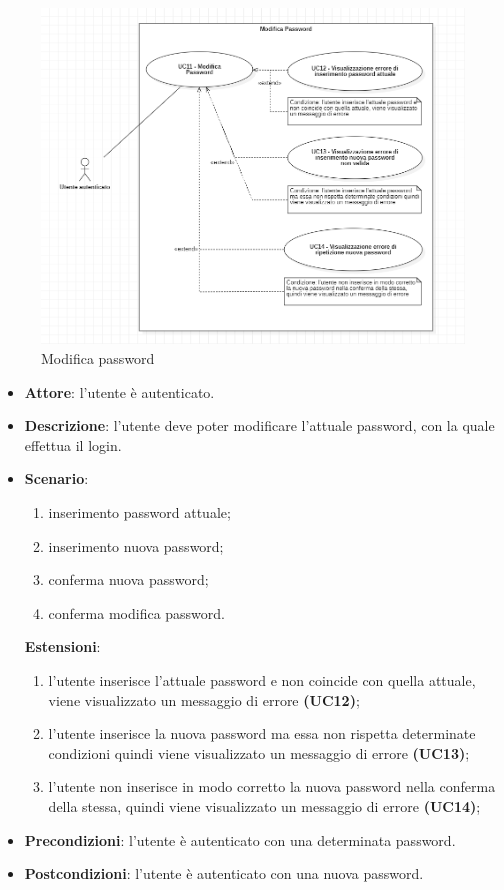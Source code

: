 \begin{figure}[H]
    \includegraphics[width=15cm]{sezioni/Images/UC11.png}
    \centering
    \caption{Modifica password}
\end{figure}

\begin{itemize}
    \item \textbf{Attore}: l'utente è autenticato.
    \item \textbf{Descrizione}: l'utente deve poter modificare l'attuale password, con la quale effettua il login.
    \item \textbf{Scenario}:
    \begin{enumerate}
        \item inserimento password attuale;
        \item inserimento nuova password;
        \item conferma nuova password;
        \item conferma modifica password.
    \end{enumerate}
    \textbf{Estensioni}:
    \begin{enumerate}
        \item l'utente inserisce l'attuale password e non coincide con quella attuale, viene visualizzato un messaggio di errore \textbf{(UC12)};
        \item l'utente inserisce la nuova password ma essa non rispetta determinate condizioni quindi viene visualizzato un messaggio di errore \textbf{(UC13)};
        \item l'utente non inserisce in modo corretto la nuova password nella conferma della stessa, quindi viene visualizzato un messaggio di errore \textbf{(UC14)};
    \end{enumerate}

    \item \textbf{Precondizioni}: l'utente è autenticato con una determinata password.
    \item \textbf{Postcondizioni}: l'utente è autenticato con una nuova password.
\end{itemize}

